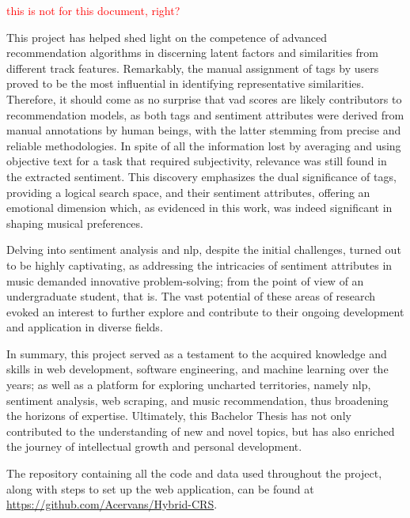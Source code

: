 \textcolor{red}{this is not for this document, right?}

This project has helped shed light on the competence of advanced recommendation algorithms in discerning latent factors and similarities from different track features. Remarkably, the manual assignment of tags by users proved to be the most influential in identifying representative similarities. Therefore, it should come as no surprise that \acs{vad} scores are likely contributors to recommendation models, as both tags and sentiment attributes were derived from manual annotations by human beings, with the latter stemming from precise and reliable methodologies. In spite of all the information lost by averaging and using objective text for a task that required subjectivity, relevance was still found in the extracted sentiment. This discovery emphasizes the dual significance of tags, providing a logical search space, and their sentiment attributes, offering an emotional dimension which, as evidenced in this work, was indeed significant in shaping musical preferences.

Delving into sentiment analysis and \acs{nlp}, despite the initial challenges, turned out to be highly captivating, as addressing the intricacies of sentiment attributes in music demanded innovative problem-solving; from the point of view of an undergraduate student, that is. The vast potential of these areas of research evoked an interest to further explore and contribute to their ongoing development and application in diverse fields.

In summary, this project served as a testament to the acquired knowledge and skills in web development, software engineering, and machine learning over the years; as well as a platform for exploring uncharted territories, namely \acs{nlp}, sentiment analysis, web scraping, and music recommendation, thus broadening the horizons of expertise. Ultimately, this Bachelor Thesis has not only contributed to the understanding of new and novel topics, but has also enriched the journey of intellectual growth and personal development.

The repository containing all the code and data used throughout the project, along with steps to set up the web application, can be found at \url{https://github.com/Acervans/Hybrid-CRS}.